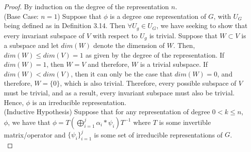 \begin{proof} By induction on the degree of the representation $n$. \\

(Base Case: $n = 1$) Suppose that $\phi$ is a degree one representation of $G$, with $U_G$ being defined as in Definition 3.14. Then $\forall U_g \in U_G$, we have seeking to show that every invariant subspace of $V$ with respect to $U_g$ is trivial. Suppose that $W \subset V$ is a subspace and let $dim(W)$ denote the dimension of $W$. Then, $dim(W) \leq dim(V) = 1$ as given by the degree of the representation. If $dim(W) = 1$, then $W=V$ and therefore, $W$ is a trivial subspace. If $dim(W) < dim(V)$, then it can only be the case that $dim(W) = 0$, and therefore, $W= \{0\}$, which is also trivial. Therefore, every possible subspace of $V$ must be trivial, and as a result, every invariant subspace must also be trivial. Hence, $\phi$ is an irreducible representation. \\

(Inductive Hypothesis) Suppose that for any representation of degree $0<k\leq n$, $\phi$, we have that $\phi =T\left(\bigoplus_{i=1}^j \alpha_i*\psi_i\right)T^{-1}$ where $T$ is some invertible matrix/operator and $\{\psi_i\}_{i=1}^j$ is some set of irreducible representations of $G$. \\


\end{proof}
